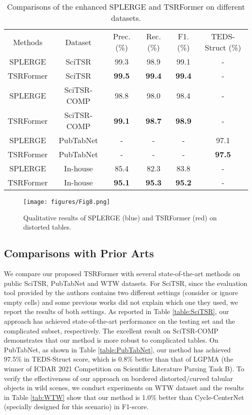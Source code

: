 \documentclass[sigconf]{acmart}
\begin{document}
\begin{table}
\small
\setlength{\tabcolsep}{1mm} 
\caption{Comparisons of the enhanced SPLERGE and TSRFormer on different datasets.}
\label{tab:InHouse}
\begin{tabular}{cccccc}
    \hline\noalign{\smallskip}
Methods & Dataset & Prec. (\%) & Rec. (\%) & F1. (\%) & TEDS-Struct (\%)\\
    \noalign{\smallskip}
    \hline
    \noalign{\smallskip}
    SPLERGE & SciTSR & 99.3 & 98.9 & 99.1 & -\\
    TSRFormer & SciTSR & \textbf{99.5} & \textbf{99.4} & \textbf{99.4} & -\\
    \hline
    SPLERGE & SciTSR-COMP & 98.8 & 98.0 & 98.4 & -\\
    TSRFormer & SciTSR-COMP & \textbf{99.1} & \textbf{98.7} & \textbf{98.9} & -\\
    \hline
    SPLERGE & PubTabNet & - & - & - & 97.1\\
    TSRFormer & PubTabNet & - & - & - & \textbf{97.5}\\
    \hline
    SPLERGE & In-house & 85.4 & 82.3 & 83.8 & -\\
    TSRFormer & In-house & \textbf{95.1} & \textbf{95.3} & \textbf{95.2} & -\\
    \hline
\end{tabular}

\end{table}

\begin{figure}
    \centering
    \texttt{[image: figures/Fig8.png]}
    \caption{Qualitative results of SPLERGE (blue) and TSRFormer (red) on distorted tables.}
    \label{fig-8}
\end{figure}

\subsection{Comparisons with Prior Arts}
We compare our proposed TSRFormer with several state-of-the-art methods on public SciTSR, PubTabNet and WTW datasets. For SciTSR, since the evaluation tool provided by the authors contains two different settings (consider or ignore empty cells) and some previous works did not explain which one they used, we report the results of both settings. As reported in Table \ref{table:SciTSR}, our approach has achieved state-of-the-art performance on the testing set and the complicated subset, respectively. The excellent result on SciTSR-COMP demonstrates that our method is more robust to complicated tables. On PubTabNet, as shown in Table \ref{table:PubTabNet}, our method has achieved 97.5\% in TEDS-Struct score, which is 0.8\% better than that of LGPMA (the winner of ICDAR 2021 Competition on Scientific Literature Parsing Task B). To verify the effectiveness of our approach on bordered distorted/curved tabular objects in wild scenes, we conduct experiments on WTW dataset and the results in Table \ref{tab:WTW} show that our method is 1.0\% better than Cycle-CenterNet (specially designed for this scenario) in F1-score. 
\end{document}

